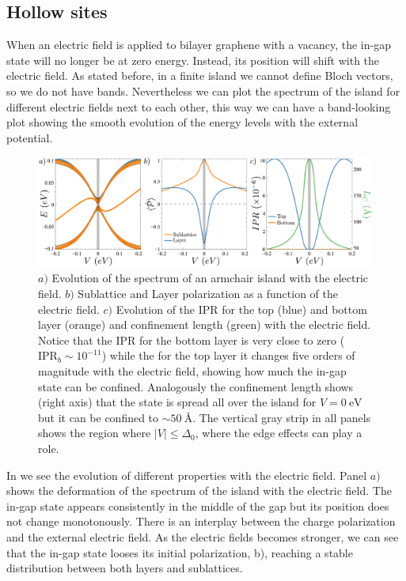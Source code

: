 \subsection{Hollow sites}
When an electric field is applied to bilayer graphene with a vacancy, the in-gap state will no longer be at zero energy. Instead, its position will shift with the electric field. As stated before, in a finite island we cannot define Bloch vectors, so we do not have bands. Nevertheless we can plot the spectrum of the island for different electric fields next to each other, this way we can have a band-looking plot showing the smooth evolution of the energy levels with the external potential.
\begin{figure}[!ht!]
\centering
\includegraphics{artlat/fig/spectrum.pdf}
\vspace{-20pt}
\caption{$a)$ Evolution of the spectrum of an armchair island with the electric field. $b)$ Sublattice and Layer polarization as a function of the electric field. $c)$ Evolution of the IPR for the top (blue) and bottom layer (orange) and confinement length (green) with the electric field. Notice that the IPR for the bottom layer is very close to zero ($\text{IPR}_b\sim10^{-11}$) while the for the top layer it changes five orders of magnitude with the electric field, showing how much the in-gap state can be confined. Analogously the confinement length shows (right axis) that the state is spread all over the island for $V=\SI{0}{\eV}$ but it can be confined to $\sim\SI{50}{\angstrom}$. The vertical gray strip in all panels shows the region where $|V|\leqslant\Delta_0$, where the edge effects can play a role.}
\label{spectrum}
\end{figure}
In  we see the evolution of different properties with the electric field. Panel $a)$ shows the deformation of the spectrum of the island with the electric field. The in-gap state appears consistently in the middle of the gap but its position does not change monotonously. There is an interplay between the charge polarization and the external electric field.
As the electric fields becomes stronger, we can see that the in-gap state looses its initial polarization, b), reaching a stable distribution between both layers and sublattices.

